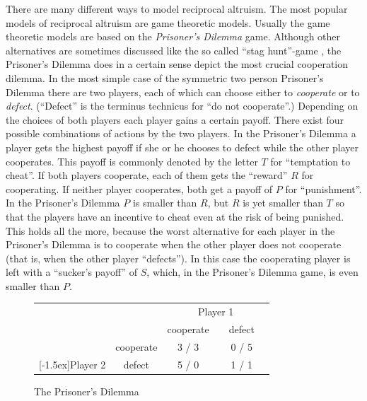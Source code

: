 There are many different ways to model reciprocal altruism. The most popular
models of reciprocal altruism are game theoretic models.  Usually the game
theoretic models are based on the {\em Prisoner's Dilemma} game.  Although
other alternatives are sometimes discussed like the so called ``stag
hunt''-game \cite[]{skyrms:2004}, the Prisoner's Dilemma does in a certain
sense depict the most crucial cooperation dilemma. In the most simple case of
the symmetric two person Prisoner's Dilemma there are two players, each of
which can choose either to {\em cooperate} or to {\em defect}. (``Defect'' is
the terminus technicus for ``do not cooperate''.) Depending on the choices of
both players each player gains a certain payoff. There exist four possible
combinations of actions by the two players. In the Prisoner's Dilemma a player
gets the highest payoff if she or he chooses to defect while the other player
cooperates. This payoff is commonly denoted by the letter $T$ for ``temptation
to cheat''. If both players cooperate, each of them gets the ``reward'' $R$
for cooperating. If neither player cooperates, both get a payoff of $P$ for
``punishment''. In the Prisoner's Dilemma $P$ is smaller than $R$, but $R$ is
yet smaller than $T$ so that the players have an incentive to cheat even at
the risk of being punished. This holds all the more, because the worst
alternative for each player in the Prisoner's Dilemma is to cooperate when the
other player does not cooperate (that is, when the other player ``defects'').
In this case the cooperating player is left with a ``sucker's payoff'' of
$S$, which, in the Prisoner's Dilemma game, is even smaller than $P$.

\begin{figure}
\begin{center}
\begin{tabular}{cc|c|c|}

& \multicolumn{1}{c}{} & \multicolumn{2}{c}{Player 1} \\
&           & cooperate & ~~defect~~ \\ \cline{2-4}
& cooperate & 3 / 3       & 0 / 5    \\ \cline{2-4}
\raisebox{1.5ex}[-1.5ex]{Player 2} 
& defect    & 5 / 0       & 1 / 1    \\ \cline{2-4}

\end{tabular}
\caption{\label{TablePD} The Prisoner's Dilemma}
\end{center}
\end{figure}

